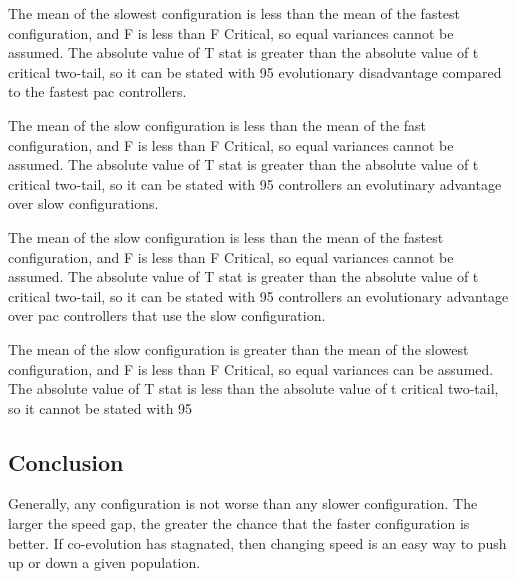 \documentclass{article}
\newcommand\tab[1][1cm]{\hspace*{#1}}
\begin{document}
\begin{flushleft}
\tab
The mean of the slowest configuration  is less than the mean
 of the fastest configuration, and F is less
 than F Critical, so equal variances cannot be assumed. The absolute value of T
 stat is greater than the absolute value of t critical two-tail, so it can be
 stated with 95%
 evolutionary disadvantage compared to the fastest pac controllers.

\tab
The mean of the slow configuration is less than the mean
 of the fast configuration, and F is less
 than F Critical, so equal variances cannot be assumed. The absolute value of T
 stat is greater than the absolute value of t critical two-tail, so it can be
 stated with 95%
 controllers an evolutinary advantage over slow configurations.

\tab
The mean of the slow configuration is less than the mean
 of the fastest configuration, and F is less
 than F Critical, so equal variances cannot be assumed. The absolute value of T
 stat is greater than the absolute value of t critical two-tail, so it can be
 stated with 95%
 controllers an evolutionary advantage over pac controllers that use the slow
 configuration.

\tab
The mean of the slow configuration is greater than the mean
 of the slowest configuration, and F is less
 than F Critical, so equal variances can be assumed. The absolute value of T
 stat is less than the absolute value of t critical two-tail, so it cannot be
 stated with 95%
\end{flushleft}

\subsection{Conclusion}
\begin{flushleft}
Generally, any configuration is not worse than any slower configuration. The
 larger the speed gap, the greater the chance that the faster configuration is
 better. If co-evolution has stagnated, then changing speed is an easy way to
 push up or down a given population.
\end{flushleft}
\end{document}
